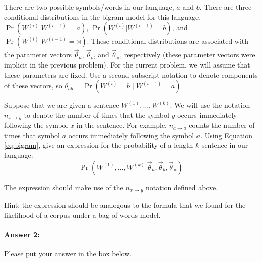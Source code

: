 \documentclass[10pt]{article}
\begin{document}
There are two possible symbols/words in our language, $a$ and $b$. There are
three conditional distributions in the bigram model for this language, 
$\Pr(W^{(i)} | W^{(i-1)}=a)$, $\Pr(W^{(i)} | W^{(i-1)}=b)$, and
$\Pr(W^{(i)} | W^{(i-1)}=\rtimes)$. 
These conditional distributions are associated with the
parameter vectors $\vec{\theta}_{a}$, $\vec{\theta}_{b}$, and
$\vec{\theta}_{\rtimes}$, respectively (these parameter vectors were implicit in the
previous problem). For the current problem, we will assume that these
parameters are fixed. Use a second subscript notation to denote components of
these vectors, so $\theta_{ab}= \Pr(W^{(i)}=b\mid W^{(i-1)}=a)$.

 Suppose that we are given a sentence $W^{(1)},\dots,W^{(k)}$. We will
use the notation $n_{x \rightarrow y}$ to denote the number of times
that the symbol $y$ occurs immediately following the symbol $x$ in the
sentence. For example, $n_{a \rightarrow a}$ counts the number of
times that symbol $a$ occurs immediately following the symbol $a$.
Using Equation \ref{eq:bigram}, give an expression for the probability
of a length $k$ sentence in our language:
\begin{equation*}
\Pr(W^{(1)},\dots,W^{(k)} | \vec{\theta}_{a}, \vec{\theta}_{b}, \vec{\theta}_{\rtimes})
\end{equation*}

 The expression should make use of the $n_{x \rightarrow y}$ notation
defined above.

 Hint: the expression should be analogous to the formula that we found
for the likelihood of a corpus under a bag of words model.

\paragraph{Answer 2:} Please put your answer in the box below.
\end{document}
